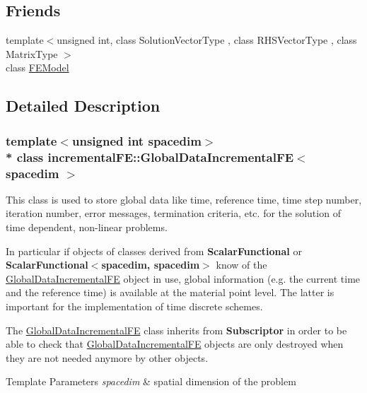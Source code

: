 \subsection*{Friends}
\begin{DoxyCompactItemize}
\item 
{\footnotesize template$<$unsigned int, class Solution\+Vector\+Type , class R\+H\+S\+Vector\+Type , class Matrix\+Type $>$ }\\class \hyperlink{classincremental_f_e_1_1_global_data_incremental_f_e_a19042fe49657aad3a64c2a04565a12d8}{F\+E\+Model}
\end{DoxyCompactItemize}


\subsection{Detailed Description}
\subsubsection*{template$<$unsigned int spacedim$>$\\*
class incremental\+F\+E\+::\+Global\+Data\+Incremental\+F\+E$<$ spacedim $>$}

This class is used to store global data like time, reference time, time step number, iteration number, error messages, termination criteria, etc. for the solution of time dependent, non-\/linear problems.

In particular if objects of classes derived from {\bf Scalar\+Functional} or {\bf Scalar\+Functional$<$spacedim, spacedim$>$} know of the \hyperlink{classincremental_f_e_1_1_global_data_incremental_f_e}{Global\+Data\+Incremental\+FE} object in use, global information (e.\+g. the current time and the reference time) is available at the material point level. The latter is important for the implementation of time discrete schemes.

The \hyperlink{classincremental_f_e_1_1_global_data_incremental_f_e}{Global\+Data\+Incremental\+FE} class inherits from {\bf Subscriptor} in order to be able to check that \hyperlink{classincremental_f_e_1_1_global_data_incremental_f_e}{Global\+Data\+Incremental\+FE} objects are only destroyed when they are not needed anymore by other objects.


\begin{DoxyTemplParams}{Template Parameters}
{\em spacedim} & spatial dimension of the problem \\
\hline
\end{DoxyTemplParams}



